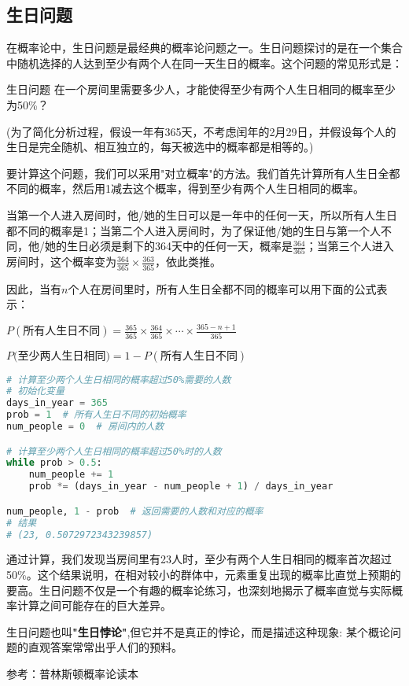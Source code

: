 
\begin{issues}
\issueDraft
\end{issues}

\subsection{生日问题}

在概率论中，生日问题是最经典的概率论问题之一。生日问题探讨的是在一个集合中随机选择的人达到至少有两个人在同一天生日的概率。这个问题的常见形式是：

\begin{example}{生日问题}
在一个房间里需要多少人，才能使得至少有两个人生日相同的概率至少为50\%？

(为了简化分析过程，假设一年有365天，不考虑闰年的2月29日，并假设每个人的生日是完全随机、相互独立的，每天被选中的概率都是相等的。)
\end{example}

要计算这个问题，我们可以采用"对立概率"的方法。我们首先计算所有人生日全都不同的概率，然后用1减去这个概率，得到至少有两个人生日相同的概率。

当第一个人进入房间时，他/她的生日可以是一年中的任何一天，所以所有人生日都不同的概率是1；当第二个人进入房间时，为了保证他/她的生日与第一个人不同，他/她的生日必须是剩下的364天中的任何一天，概率是$\frac{364}{365}$；当第三个人进入房间时，这个概率变为$\frac{364}{365} \times \frac{363}{365}$，依此类推。

因此，当有$n$个人在房间里时，所有人生日全都不同的概率可以用下面的公式表示：

$
P(\text{所有人生日不同}) = \frac{365}{365} \times \frac{364}{365} \times \cdots \times \frac{365-n+1}{365}
$

$P(\text{至少两人生日相同)} = 1-P(\text{所有人生日不同})$

\begin{lstlisting}[language=python]
# 计算至少两个人生日相同的概率超过50%需要的人数
# 初始化变量
days_in_year = 365
prob = 1  # 所有人生日不同的初始概率
num_people = 0  # 房间内的人数

# 计算至少两个人生日相同的概率超过50%时的人数
while prob > 0.5:
    num_people += 1
    prob *= (days_in_year - num_people + 1) / days_in_year

num_people, 1 - prob  # 返回需要的人数和对应的概率
# 结果 
# (23, 0.5072972343239857)
\end{lstlisting}

通过计算，我们发现当房间里有23人时，至少有两个人生日相同的概率首次超过50\%。这个结果说明，在相对较小的群体中，元素重复出现的概率比直觉上预期的要高。生日问题不仅是一个有趣的概率论练习，也深刻地揭示了概率直觉与实际概率计算之间可能存在的巨大差异。


生日问题也叫\textbf{"生日悖论"},但它并不是真正的悖论，而是描述这种现象: 某个概论问题的直观答案常常出乎人们的预料。



参考：普林斯顿概率论读本